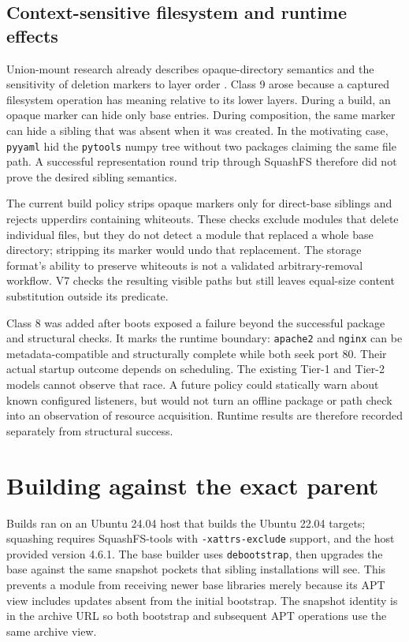 \subsection{Context-sensitive filesystem and runtime effects}

Union-mount research already describes opaque-directory semantics and the sensitivity of deletion markers to layer order \autocite{pendry1995union}. Class \num{9} arose because a captured filesystem operation has meaning relative to its lower layers. During a build, an opaque marker can hide only base entries. During composition, the same marker can hide a sibling that was absent when it was created. In the motivating case, \texttt{pyyaml} hid the \texttt{pytools} numpy tree without two packages claiming the same file path. A successful representation round trip through SquashFS therefore did not prove the desired sibling semantics.

The current build policy strips opaque markers only for direct-base siblings and rejects upperdirs containing whiteouts. These checks exclude modules that delete individual files, but they do not detect a module that replaced a whole base directory; stripping its marker would undo that replacement. The storage format's ability to preserve whiteouts is not a validated arbitrary-removal workflow. V7 checks the resulting visible paths but still leaves equal-size content substitution outside its predicate.

Class \num{8} was added after boots exposed a failure beyond the successful package and structural checks. It marks the runtime boundary: \texttt{apache2} and \texttt{nginx} can be metadata-compatible and structurally complete while both seek port \num{80}. Their actual startup outcome depends on scheduling. The existing Tier-1 and Tier-2 models cannot observe that race. A future policy could statically warn about known configured listeners, but would not turn an offline package or path check into an observation of resource acquisition. Runtime results are therefore recorded separately from structural success.

\section{Building against the exact parent}
\label{sec:arch:build}

Builds ran on an Ubuntu \num{24.04} host that builds the Ubuntu \num{22.04} targets; squashing requires SquashFS-tools with \texttt{-xattrs-exclude} support, and the host provided version 4.6.1. The base builder uses \texttt{debootstrap}, then upgrades the base against the same snapshot pockets that sibling installations will see. This prevents a module from receiving newer base libraries merely because its \ac{APT} view includes updates absent from the initial bootstrap. The snapshot identity is in the archive URL so both bootstrap and subsequent \ac{APT} operations use the same archive view.


